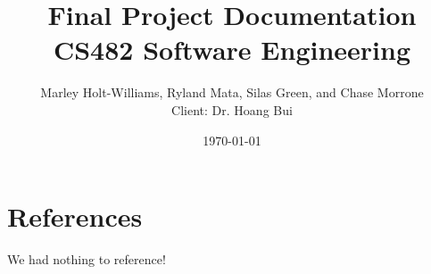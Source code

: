 \documentclass[12pt]{article} %
\title{Final Project Documentation
\\
CS482 Software Engineering}
\author{Marley Holt-Williams, Ryland Mata, Silas Green, and Chase Morrone\\
Client: Dr. Hoang Bui}
\date{\today}
\begin{document}
\maketitle

\pagebreak
\tableofcontents


\pagebreak







 



\pagebreak
\section{References}
We had nothing to reference!
\clearpage
\end{document}
